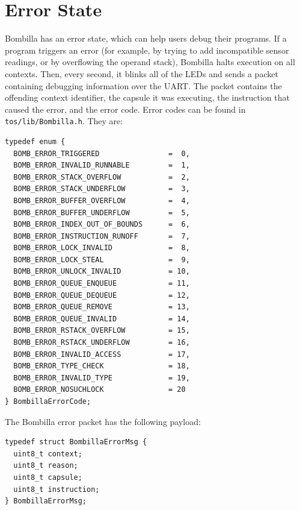 \documentclass[10pt]{article}
\begin{document}
\section{Error State}

Bombilla has an error state, which can help users debug their
programs. If a program triggers an error (for example, by trying to
add incompatible sensor readings, or by overflowing the operand
stack), Bombilla halts execution on all contexts. Then, every second,
it blinks all of the LEDs and sends a packet containing debugging
information over the UART. The packet contains the offending context
identifier, the capsule it was executing, the instruction that caused
the error, and the error code. Error codes can be found in
{\tt tos/lib/Bombilla.h}. They are:

\begin{verbatim}
typedef enum {
  BOMB_ERROR_TRIGGERED                =  0,
  BOMB_ERROR_INVALID_RUNNABLE         =  1,
  BOMB_ERROR_STACK_OVERFLOW           =  2,
  BOMB_ERROR_STACK_UNDERFLOW          =  3, 
  BOMB_ERROR_BUFFER_OVERFLOW          =  4,
  BOMB_ERROR_BUFFER_UNDERFLOW         =  5,
  BOMB_ERROR_INDEX_OUT_OF_BOUNDS      =  6,
  BOMB_ERROR_INSTRUCTION_RUNOFF       =  7,
  BOMB_ERROR_LOCK_INVALID             =  8,
  BOMB_ERROR_LOCK_STEAL               =  9,
  BOMB_ERROR_UNLOCK_INVALID           = 10,
  BOMB_ERROR_QUEUE_ENQUEUE            = 11,
  BOMB_ERROR_QUEUE_DEQUEUE            = 12,
  BOMB_ERROR_QUEUE_REMOVE             = 13,
  BOMB_ERROR_QUEUE_INVALID            = 14,
  BOMB_ERROR_RSTACK_OVERFLOW          = 15,
  BOMB_ERROR_RSTACK_UNDERFLOW         = 16, 
  BOMB_ERROR_INVALID_ACCESS           = 17,
  BOMB_ERROR_TYPE_CHECK               = 18,
  BOMB_ERROR_INVALID_TYPE             = 19,
  BOMB_ERROR_NOSUCHLOCK               = 20
} BombillaErrorCode;
\end{verbatim}

The Bombilla error packet has the following payload:

\begin{verbatim}
typedef struct BombillaErrorMsg {
  uint8_t context;
  uint8_t reason;
  uint8_t capsule;
  uint8_t instruction;
} BombillaErrorMsg;
\end{verbatim}



\end{document}
